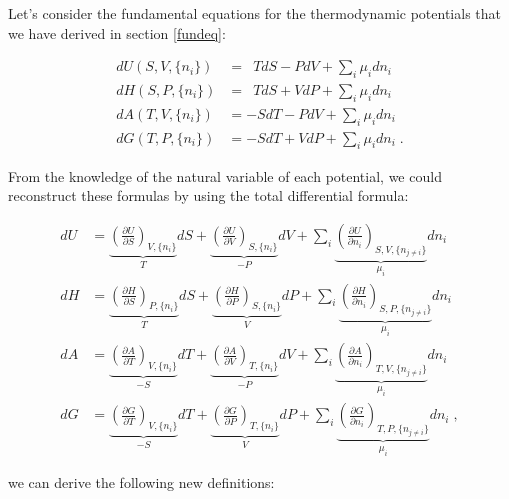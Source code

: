 \documentclass[
  9pt,
]{extbook}
\theoremstyle{definition}
\theoremstyle{definition}
\theoremstyle{definition}
\theoremstyle{remark}
\begin{document}
Let's consider the fundamental equations for the thermodynamic potentials that we have derived in section \ref{fundeq}:

\begin{equation}
\begin{aligned}
dU(S,V,\{n_i\}) &= \enspace T dS -P dV + \sum_i \mu_i dn_i \\
dH(S,P,\{n_i\}) &= \enspace T dS + V dP + \sum_i \mu_i dn_i \\
dA(T,V,\{n_i\}) &= -S dT -P dV + \sum_i \mu_i dn_i \\
dG(T,P,\{n_i\}) &= -S dT + V dP + \sum_i \mu_i dn_i\;.
\end{aligned}
\label{eq:dhagchem1}
\end{equation}

From the knowledge of the natural variable of each potential, we could reconstruct these formulas by using the total differential formula:

\begin{equation}
\begin{aligned}
dU &= \underbrace{\left(\frac{\partial U}{\partial S} \right)_{V,\{n_i\}}}_{T} dS + \underbrace{\left(\frac{\partial U}{\partial V} \right)_{S,\{n_i\}}}_{-P} dV + \sum_i \underbrace{\left(\frac{\partial U}{\partial n_i} \right)_{S,V,\{n_{j \neq i}\}}}_{\mu_i} dn_i \\
dH &= \underbrace{\left(\frac{\partial H}{\partial S} \right)_{P,\{n_i\}}}_{T} dS + \underbrace{\left(\frac{\partial H}{\partial P} \right)_{S,\{n_i\}}}_{V} dP + \sum_i \underbrace{\left(\frac{\partial H}{\partial n_i} \right)_{S,P,\{n_{j \neq i}\}}}_{\mu_i} dn_i \\
dA &= \underbrace{\left(\frac{\partial A}{\partial T} \right)_{V,\{n_i\}}}_{-S} dT + \underbrace{\left(\frac{\partial A}{\partial V} \right)_{T,\{n_i\}}}_{-P} dV + \sum_i \underbrace{\left(\frac{\partial A}{\partial n_i} \right)_{T,V,\{n_{j \neq i}\}}}_{\mu_i} dn_i \\
dG &= \underbrace{\left(\frac{\partial G}{\partial T} \right)_{V,\{n_i\}}}_{-S} dT + \underbrace{\left(\frac{\partial G}{\partial P} \right)_{T,\{n_i\}}}_{V} dP + \sum_i \underbrace{\left(\frac{\partial G}{\partial n_i} \right)_{T,P,\{n_{j \neq i}\}}}_{\mu_i} dn_i\;,
\end{aligned}
\label{eq:dhagchem2}
\end{equation}

we can derive the following new definitions:
\end{document}

